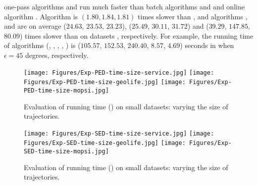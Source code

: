 { {one-pass algorithms \intersec and \interval run much faster than batch algorithms \tpa and \dpa and online algorithm \opwa.}
%
%
Algorithm \interval is $(1.80, 1.84, 1.81)$ times slower than \intersec, and algorithms \tpa, \dpa and \opwa are on average
($24.63$, $23.53$, $23.23$), ($25.49$, $30.11$, $31.72$) and ($39.29$, $147.85$, $80.09$)
times slower than \intersec on datasets \dSets, respectively.
%
For example, the running time of algorithms
(\tpa, \dpa, \opwa, \interval, \intersec) is ($105.57$, $152.53$, $240.40$, $8.57$, $4.69$) seconds in \mopsi when
$\epsilon=45$ degrees, respectively.



\begin{figure*}[tb!]
	\centering
	\texttt{[image: Figures/Exp-PED-time-size-service.jpg]}	\hspace{0.5ex}
	\texttt{[image: Figures/Exp-PED-time-size-geolife.jpg]}	\hspace{0.5ex}
	\texttt{[image: Figures/Exp-PED-time-size-mopsi.jpg]}	
	\vspace{-2ex}
	\caption{\small Evaluation of running time (\ped) on small datasets: varying the size of trajectories.}\label{fig:time-size-ped}
	\vspace{-2ex}
\end{figure*}

\begin{figure*}[tb!]
	\centering
	\texttt{[image: Figures/Exp-SED-time-size-service.jpg]}	\hspace{0.5ex}
	\texttt{[image: Figures/Exp-SED-time-size-geolife.jpg]}	\hspace{0.5ex}
	\texttt{[image: Figures/Exp-SED-time-size-mopsi.jpg]}	
	\vspace{-2ex}
	\caption{\small Evaluation of running time (\sed) on small datasets: varying the size of trajectories.}\label{fig:time-size-sed}
	\vspace{-2ex}
\end{figure*}

}
